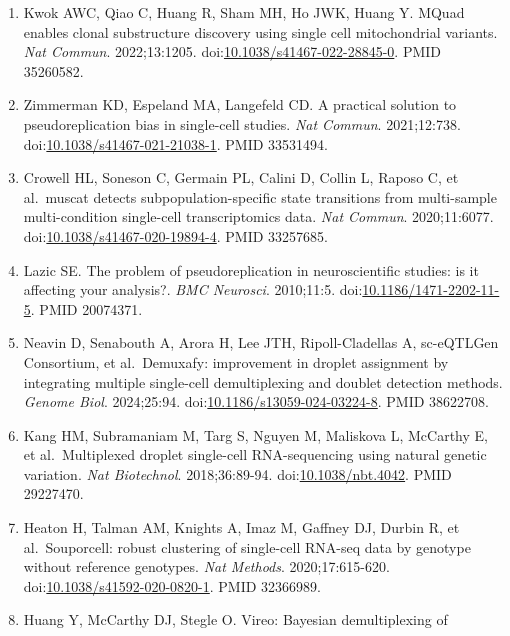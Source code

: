 \documentclass[11pt]{article}
\begin{document}
\begin{enumerate}
  \emph{Nature}. 2024;627:389-398.
  doi:\href{https://doi.org/10.1038/s41586-024-07066-z}{10.1038/s41586-024-07066-z}.
  PMID 38253266.
\item
  Kwok AWC, Qiao C, Huang R, Sham MH, Ho JWK, Huang Y. MQuad enables
  clonal substructure discovery using single cell mitochondrial
  variants. \emph{Nat Commun}. 2022;13:1205.
  doi:\href{https://doi.org/10.1038/s41467-022-28845-0}{10.1038/s41467-022-28845-0}.
  PMID 35260582.
\item
  Zimmerman KD, Espeland MA, Langefeld CD. A practical solution to
  pseudoreplication bias in single-cell studies. \emph{Nat Commun}.
  2021;12:738.
  doi:\href{https://doi.org/10.1038/s41467-021-21038-1}{10.1038/s41467-021-21038-1}.
  PMID 33531494.
\item
  Crowell HL, Soneson C, Germain PL, Calini D, Collin L, Raposo C, et
  al.~muscat detects subpopulation-specific state transitions from
  multi-sample multi-condition single-cell transcriptomics data.
  \emph{Nat Commun}. 2020;11:6077.
  doi:\href{https://doi.org/10.1038/s41467-020-19894-4}{10.1038/s41467-020-19894-4}.
  PMID 33257685.
\item
  Lazic SE. The problem of pseudoreplication in neuroscientific studies:
  is it affecting your analysis?. \emph{BMC Neurosci}. 2010;11:5.
  doi:\href{https://doi.org/10.1186/1471-2202-11-5}{10.1186/1471-2202-11-5}.
  PMID 20074371.
\item
  Neavin D, Senabouth A, Arora H, Lee JTH, Ripoll-Cladellas A,
  sc-eQTLGen Consortium, et al.~Demuxafy: improvement in droplet
  assignment by integrating multiple single-cell demultiplexing and
  doublet detection methods. \emph{Genome Biol}. 2024;25:94.
  doi:\href{https://doi.org/10.1186/s13059-024-03224-8}{10.1186/s13059-024-03224-8}.
  PMID 38622708.
\item
  Kang HM, Subramaniam M, Targ S, Nguyen M, Maliskova L, McCarthy E, et
  al.~Multiplexed droplet single-cell RNA-sequencing using natural
  genetic variation. \emph{Nat Biotechnol}. 2018;36:89-94.
  doi:\href{https://doi.org/10.1038/nbt.4042}{10.1038/nbt.4042}. PMID
  29227470.
\item
  Heaton H, Talman AM, Knights A, Imaz M, Gaffney DJ, Durbin R, et
  al.~Souporcell: robust clustering of single-cell RNA-seq data by
  genotype without reference genotypes. \emph{Nat Methods}.
  2020;17:615-620.
  doi:\href{https://doi.org/10.1038/s41592-020-0820-1}{10.1038/s41592-020-0820-1}.
  PMID 32366989.
\item
  Huang Y, McCarthy DJ, Stegle O. Vireo: Bayesian demultiplexing of

\end{enumerate}
\end{document}
